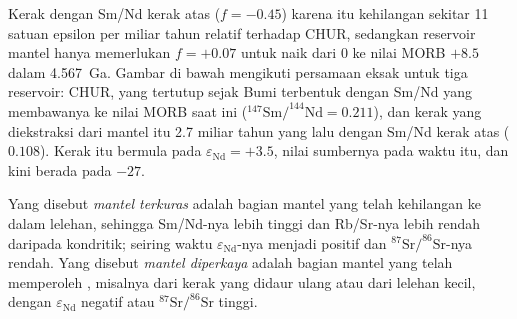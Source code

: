 Kerak dengan Sm/Nd kerak atas ($f = -0.45$) karena itu kehilangan sekitar
11 satuan epsilon per miliar tahun relatif terhadap CHUR, sedangkan reservoir mantel
hanya memerlukan $f = +0.07$ untuk naik dari 0 ke nilai MORB $+8.5$ dalam
\qty{4.567}{Ga}. Gambar di bawah mengikuti persamaan eksak untuk tiga
reservoir: CHUR,  yang tertutup sejak Bumi terbentuk dengan Sm/Nd
yang membawanya ke nilai MORB saat ini ($^{147}\mathrm{Sm}/^{144}\mathrm{Nd} =
0.211$), dan kerak yang diekstraksi dari mantel itu 2.7 miliar tahun yang lalu dengan
Sm/Nd kerak atas ($0.108$). Kerak itu bermula pada $\varepsilon_{\mathrm{Nd}} =
+3.5$, nilai sumbernya pada waktu itu, dan kini berada pada $-27$.

\begin{definition}\label{def:b2:isotope-geochemistry:reservoirs}
Yang disebut \emph{mantel terkuras} adalah bagian mantel yang telah
kehilangan  ke dalam lelehan, sehingga Sm/Nd-nya lebih tinggi dan Rb/Sr-nya
lebih rendah daripada kondritik; seiring waktu $\varepsilon_{\mathrm{Nd}}$-nya menjadi positif dan
$^{87}\mathrm{Sr}/^{86}\mathrm{Sr}$-nya rendah. Yang disebut \emph{mantel
diperkaya} adalah bagian mantel yang telah memperoleh
, misalnya dari kerak yang didaur ulang atau dari lelehan kecil,
dengan $\varepsilon_{\mathrm{Nd}}$ negatif atau $^{87}\mathrm{Sr}/^{86}\mathrm{Sr}$ tinggi.
\end{definition}

